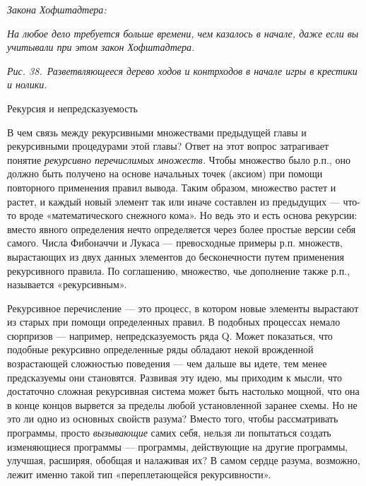 \emph{Закона Хофштадтера:}

\emph{На любое дело требуется больше времени, чем казалось в начале, даже если вы учитывали при этом закон Хофштадтера.}

\emph{Рис. 38.~Разветвляющееся дерево ходов и контрходов в начале игры в крестики и нолики.}

Рекурсия и непредсказуемость

В чем связь между рекурсивными множествами предыдущей главы и рекурсивными процедурами этой главы? Ответ на этот вопрос затрагивает понятие \emph{рекурсивно перечислимых множеств.} Чтобы множество было р.п., оно должно быть получено на основе начальных точек (аксиом) при помощи повторного применения правил вывода. Таким образом, множество растет и растет, и каждый новый элемент так или иначе составлен из предыдущих --- что-то вроде «математического снежного кома». Но ведь это и есть основа рекурсии: вместо явного определения нечто определяется через более простые версии себя самого. Числа Фибоначчи и Лукаса --- превосходные примеры р.п. множеств, вырастающих из двух данных элементов до бесконечности путем применения рекурсивного правила. По соглашению, множество, чье дополнение также р.п., называется «рекурсивным».

Рекурсивное перечисление --- это процесс, в котором новые элементы вырастают из старых при помощи определенных правил. В подобных процессах немало сюрпризов --- например, непредсказуемость ряда Q. Может показаться, что подобные рекурсивно определенные ряды обладают некой врожденной возрастающей сложностью поведения --- чем дальше вы идете, тем менее предсказуемы они становятся. Развивая эту идею, мы приходим к мысли, что достаточно сложная рекурсивная система может быть настолько мощной, что она в конце концов вырвется за пределы любой установленной заранее схемы. Но не это ли одно из основных свойств разума? Вместо того, чтобы рассматривать программы, просто \emph{вызывающие} самих себя, нельзя ли попытаться создать изменяющиеся программы --- программы, действующие на другие программы, улучшая, расширяя, обобщая и налаживая их? В самом сердце разума, возможно, лежит именно такой тип «переплетающейся рекурсивности».

